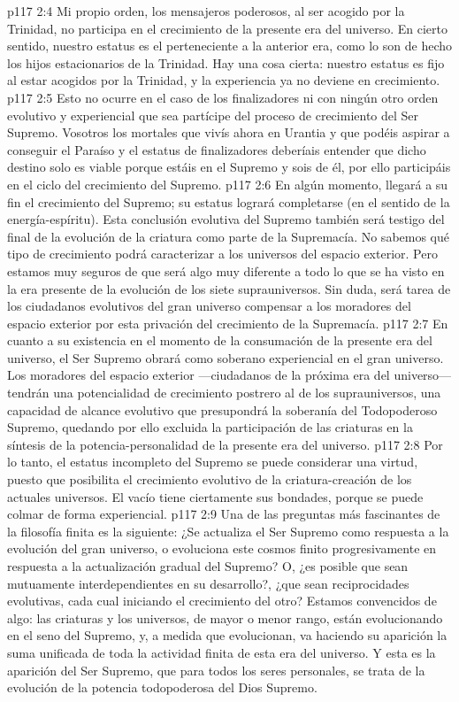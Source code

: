 \vs p117 2:4 Mi propio orden, los mensajeros poderosos, al ser acogido por la Trinidad, no participa en el crecimiento de la presente era del universo. En cierto sentido, nuestro estatus es el perteneciente a la anterior era, como lo son de hecho los hijos estacionarios de la Trinidad. Hay una cosa cierta: nuestro estatus es fijo al estar acogidos por la Trinidad, y la experiencia ya no deviene en crecimiento.
\vs p117 2:5 Esto no ocurre en el caso de los finalizadores ni con ningún otro orden evolutivo y experiencial que sea partícipe del proceso de crecimiento del Ser Supremo. Vosotros los mortales que vivís ahora en Urantia y que podéis aspirar a conseguir el Paraíso y el estatus de finalizadores deberíais entender que dicho destino solo es viable porque estáis en el Supremo y sois de él, por ello participáis en el ciclo del crecimiento del Supremo.
\vs p117 2:6 \pc En algún momento, llegará a su fin el crecimiento del Supremo; su estatus logrará completarse (en el sentido de la energía\hyp{}espíritu). Esta conclusión evolutiva del Supremo también será testigo del final de la evolución de la criatura como parte de la Supremacía. No sabemos qué tipo de crecimiento podrá caracterizar a los universos del espacio exterior. Pero estamos muy seguros de que será algo muy diferente a todo lo que se ha visto en la era presente de la evolución de los siete suprauniversos. Sin duda, será tarea de los ciudadanos evolutivos del gran universo compensar a los moradores del espacio exterior por esta privación del crecimiento de la Supremacía.
\vs p117 2:7 En cuanto a su existencia en el momento de la consumación de la presente era del universo, el Ser Supremo obrará como soberano experiencial en el gran universo. Los moradores del espacio exterior ---ciudadanos de la próxima era del universo--- tendrán una potencialidad de crecimiento postrero al de los suprauniversos, una capacidad de alcance evolutivo que presupondrá la soberanía del Todopoderoso Supremo, quedando por ello excluida la participación de las criaturas en la síntesis de la potencia\hyp{}personalidad de la presente era del universo.
\vs p117 2:8 Por lo tanto, el estatus incompleto del Supremo se puede considerar una virtud, puesto que posibilita el crecimiento evolutivo de la criatura\hyp{}creación de los actuales universos. El vacío tiene ciertamente sus bondades, porque se puede colmar de forma experiencial.
\vs p117 2:9 \pc Una de las preguntas más fascinantes de la filosofía finita es la siguiente: ¿Se actualiza el Ser Supremo como respuesta a la evolución del gran universo, o evoluciona este cosmos finito progresivamente en respuesta a la actualización gradual del Supremo? O, ¿es posible que sean mutuamente interdependientes en su desarrollo?, ¿que sean reciprocidades evolutivas, cada cual iniciando el crecimiento del otro? Estamos convencidos de algo: las criaturas y los universos, de mayor o menor rango, están evolucionando en el seno del Supremo, y, a medida que evolucionan, va haciendo su aparición la suma unificada de toda la actividad finita de esta era del universo. Y esta es la aparición del Ser Supremo, que para todos los seres personales, se trata de la evolución de la potencia todopoderosa del Dios Supremo.
